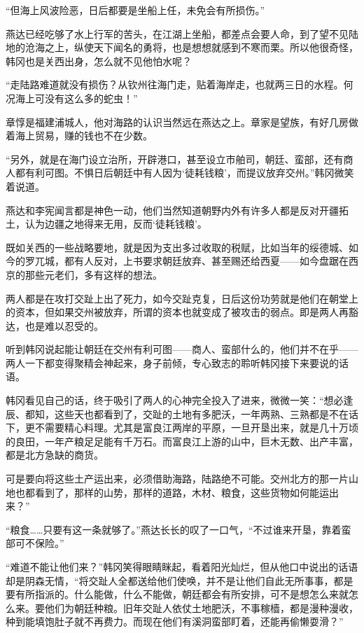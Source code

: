 “但海上风波险恶，日后都要是坐船上任，未免会有所损伤。”

燕达已经吃够了水上行军的苦头，在江湖上坐船，都差点会要人命，到了望不见陆地的沧海之上，纵使天下闻名的勇将，也是想想就感到不寒而栗。所以他很奇怪，韩冈也是关西出身，怎么就不见他怕水呢？

“走陆路难道就没有损伤？从钦州往海门走，贴着海岸走，也就两三日的水程。何况海上可没有这么多的蛇虫！”

章惇是福建浦城人，他对海路的认识当然远在燕达之上。章家是望族，有好几房做着海上贸易，赚的钱也不在少数。

“另外，就是在海门设立治所，开辟港口，甚至设立市舶司，朝廷、蛮部，还有商人都有利可图。不惧日后朝廷中有人因为‘徒耗钱粮’，而提议放弃交州。”韩冈微笑着说道。

燕达和李宪闻言都是神色一动，他们当然知道朝野内外有许多人都是反对开疆拓土，认为边疆之地得来无用，反而‘徒耗钱粮’。

既如关西的一些战略要地，就是因为支出多过收取的税赋，比如当年的绥德城、如今的罗兀城，都有人反对，上书要求朝廷放弃、甚至赐还给西夏——如今盘踞在西京的那些元老们，多有这样的想法。

两人都是在攻打交趾上出了死力，如今交趾克复，日后这份功劳就是他们在朝堂上的资本，但如果交州被放弃，所谓的资本也就变成了被攻击的弱点。即是两人再豁达，也是难以忍受的。

听到韩冈说起能让朝廷在交州有利可图——商人、蛮部什么的，他们并不在乎——两人一下都变得聚精会神起来，身子前倾，专心致志的聆听韩冈接下来要说的话语。

韩冈看见自己的话，终于吸引了两人的心神完全投入了进来，微微一笑：“想必逢辰、都知，这些天也都看到了，交趾的土地有多肥沃，一年两熟、三熟都是不在话下，更不需要精心料理。尤其是富良江两岸的平原，一旦开垦出来，就是几十万顷的良田，一年产粮足足能有千万石。而富良江上游的山中，巨木无数、出产丰富，都是北方急缺的商货。

可是要向将这些土产运出来，必须借助海路，陆路绝不可能。交州北方的那一片山地也都看到了，那样的山势，那样的道路，木材、粮食，这些货物如何能运出来？”

“粮食……只要有这一条就够了。”燕达长长的叹了一口气，“不过谁来开垦，靠着蛮部可不保险。”

“难道不能让他们来？”韩冈笑得眼睛眯起，看着阳光灿烂，但从他口中说出的话语却是阴森无情，“将交趾人全都送给他们使唤，并不是让他们自此无所事事，都是要有所指派的。什么能做，什么不能做，朝廷都会有所安排，可不是想怎么来就怎么来。要他们为朝廷种粮。旧年交趾人依仗土地肥沃，不事稼樯，都是漫种漫收，种到能填饱肚子就不再费力。而现在他们有溪洞蛮部盯着，还能再偷懒耍滑？”

